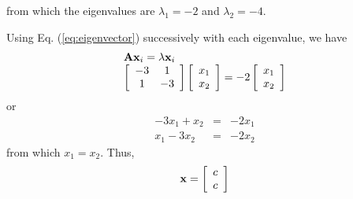 from which the eigenvalues are $\lambda_1 = -2$ and $\lambda_2 = -4$. 

Using Eq. (\ref{eq:eigenvector}) successively with each eigenvalue, we have
\[
\begin{array}{l}
 {\bf{Ax}}_i  = \lambda {\bf{x}}_i  \\ 
 \left[ {\begin{array}{*{20}c}
   { - 3} & 1  \\
   1 & { - 3}  \\
\end{array}} \right]\left[ {\begin{array}{*{20}c}
   {x_1 }  \\
   {x_2 }  \\
\end{array}} \right] =  - 2\left[ {\begin{array}{*{20}c}
   {x_1 }  \\
   {x_2 }  \\
\end{array}} \right] \\ 
 \end{array}
\]
or
\begin{eqnarray*}
-3x_1+x_2 & = & -2x_1 \\
x_1-3x_2 & = & -2x_2
\end{eqnarray*}
from which $x_1 = x_2$. Thus,
\begin{equation}\label{ex1:ev1}
{\bf{x}} = \left[ {\begin{array}{*{20}c}
   c  \\
   c  \\
\end{array}} \right]
\end{equation}
